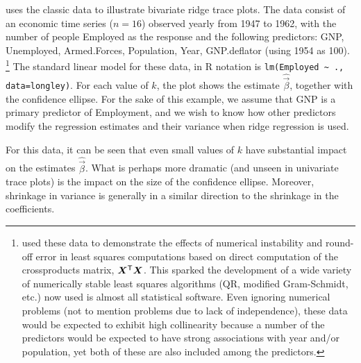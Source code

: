 uses the classic \citet{Longley:1967}
data to illustrate
bivariate ridge trace plots.  The data consist of an economic time series ($n=16$)
observed yearly from 1947 to 1962, with the number of people Employed as the
response and the following predictors:
GNP, Unemployed,  Armed.Forces,  Population,  Year,  GNP.deflator (using
1954 as 100).%
\footnote{
\citet{Longley:1967} used these data to demonstrate the effects of 
numerical instability and round-off error in least squares computations
based on direct computation of the crossproducts matrix, $\bm{X}^\mathsf{T}\bm{X}$.
This sparked the development of a wide variety of
numerically stable least squares algorithms (QR, modified Gram-Schmidt, etc.)
now used is almost all statistical software.
Even ignoring numerical problems 
(not to mention problems due to lack of independence), these
data would be expected to exhibit high collinearity because  
a number of the predictors would be expected to have strong associations
with year and/or population, yet both of these are also included among the
predictors.
}
The standard linear model for these data, in R notation
is \verb|lm(Employed ~ ., data=longley)|.  For each value of $k$, the plot 
shows the estimate $\widehat{\vec{\beta}}$, together with the confidence
ellipse.  For the sake of this example, we assume that GNP is a primary
predictor of Employment, and we wish to know how other predictors modify the
regression estimates and their variance when ridge regression is used.

For this data, it can be seen that even small values of $k$ have substantial
impact on the estimates $\widehat{\vec{\beta}}$. What is perhaps more dramatic
(and unseen in univariate trace plots) is the impact on the size of the confidence
ellipse.  Moreover, shrinkage in variance is generally in a similar direction to the
shrinkage in the coefficients.
